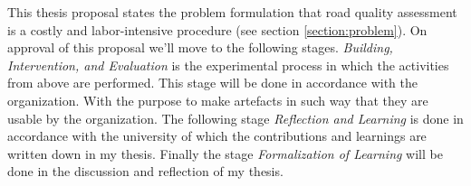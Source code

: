This thesis proposal states the problem formulation that road quality assessment is a costly and labor-intensive procedure (see section \ref{section:problem}). On approval of this proposal we'll move to the following stages. \textit{Building, Intervention, and Evaluation} is the experimental process in which the activities from above are performed. This stage will be done in accordance with the organization. With the purpose to make artefacts in such way that they are usable by the organization. The following stage \textit{Reflection and Learning} is done in accordance with the university of which the contributions and learnings are written down in my thesis. Finally the stage \textit{Formalization of Learning} will be done in the discussion and reflection of my thesis.

